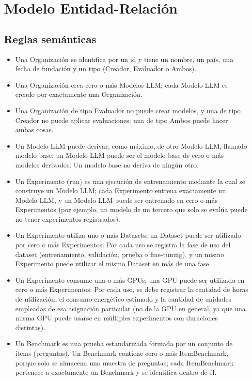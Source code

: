 \documentclass[12pt,a4paper]{article}
\begin{document}
\section{Modelo Entidad-Relación}

\subsection{Reglas semánticas}
{\begin{itemize}
  \item Una Organización se identifica por un id y tiene un nombre, un país, una fecha de fundación y un tipo (Creador, Evaluador o Ambos).
  \item Una Organización crea cero o más Modelos LLM; cada Modelo LLM es creado por exactamente una Organización.
  \item Una Organización de tipo Evaluador no puede crear modelos, y una de tipo Creador no puede aplicar evaluaciones; una de tipo Ambos puede hacer ambas cosas.
  \item Un Modelo LLM puede derivar, como máximo, de otro Modelo LLM, llamado modelo base; un Modelo LLM puede ser el modelo base de cero o más modelos derivados. Un modelo base no deriva de ningún otro.
  \item Un Experimento (run) es una ejecución de entrenamiento mediante la cual se construye un Modelo LLM; cada Experimento entrena exactamente un Modelo LLM, y un Modelo LLM puede ser entrenado en cero o más Experimentos (por ejemplo, un modelo de un tercero que solo se evalúa puede no tener experimentos registrados).
  \item Un Experimento utiliza uno o más Datasets; un Dataset puede ser utilizado por cero o más Experimentos. Por cada uso se registra la fase de uso del dataset (entrenamiento, validación, prueba o fine-tuning), y un mismo Experimento puede utilizar el mismo Dataset en más de una fase.
  \item Un Experimento consume una o más GPUs; una GPU puede ser utilizada en cero o más Experimentos. Por cada uso, se debe registrar la cantidad de horas de utilización, el consumo energético estimado y la cantidad de unidades empleadas de esa asignación particular (no de la GPU en general, ya que una misma GPU puede usarse en múltiples experimentos con duraciones distintas).
  \item Un Benchmark es una prueba estandarizada formada por un conjunto de ítems (preguntas). Un Benchmark contiene cero o más ItemBenchmark, porque solo se almacena una muestra de preguntas; cada ItemBenchmark pertenece a exactamente un Benchmark y se identifica dentro de él.

\end{itemize}}
\end{document}
